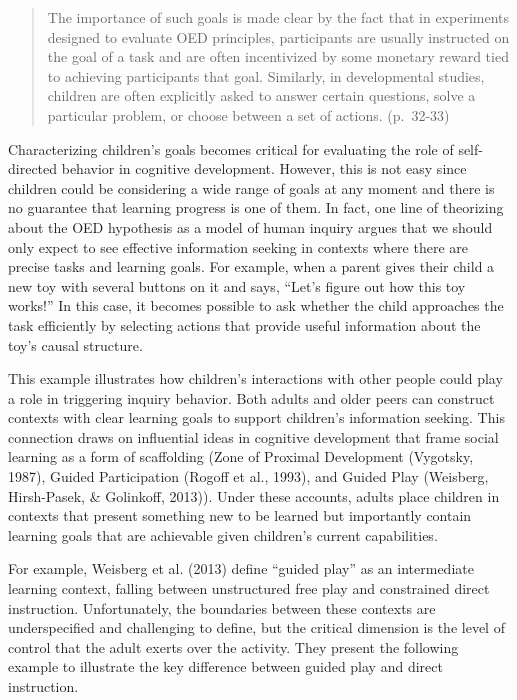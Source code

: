\documentclass[english,floatsintext,man]{apa6}
\theoremstyle{definition}
\theoremstyle{definition}
\theoremstyle{definition}
\theoremstyle{remark}
\begin{document}
\begin{quote}
The importance of such goals is made clear by the fact that in
experiments designed to evaluate OED principles, participants are
usually instructed on the goal of a task and are often incentivized by
some monetary reward tied to achieving participants that goal.
Similarly, in developmental studies, children are often explicitly asked
to answer certain questions, solve a particular problem, or choose
between a set of actions. (p.~32-33)
\end{quote}

\noindent
Characterizing children's goals becomes critical for evaluating the role
of self-directed behavior in cognitive development. However, this is not
easy since children could be considering a wide range of goals at any
moment and there is no guarantee that learning progress is one of them.
In fact, one line of theorizing about the OED hypothesis as a model of
human inquiry argues that we should only expect to see effective
information seeking in contexts where there are precise tasks and
learning goals. For example, when a parent gives their child a new toy
with several buttons on it and says, \enquote{Let's figure out how this
toy works!} In this case, it becomes possible to ask whether the child
approaches the task efficiently by selecting actions that provide useful
information about the toy's causal structure.

This example illustrates how children's interactions with other people
could play a role in triggering inquiry behavior. Both adults and older
peers can construct contexts with clear learning goals to support
children's information seeking. This connection draws on influential
ideas in cognitive development that frame social learning as a form of
scaffolding (Zone of Proximal Development (Vygotsky, 1987), Guided
Participation (Rogoff et al., 1993), and Guided Play (Weisberg,
Hirsh-Pasek, \& Golinkoff, 2013)). Under these accounts, adults place
children in contexts that present something new to be learned but
importantly contain learning goals that are achievable given children's
current capabilities.

For example, Weisberg et al. (2013) define \enquote{guided play} as an
intermediate learning context, falling between unstructured free play
and constrained direct instruction. Unfortunately, the boundaries
between these contexts are underspecified and challenging to define, but
the critical dimension is the level of control that the adult exerts
over the activity. They present the following example to illustrate the
key difference between guided play and direct instruction.
\end{document}
